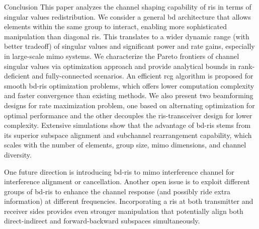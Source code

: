 \documentclass[journal]{IEEEtran}
\begin{document}
\begin{section}{Conclusion}
	This paper analyzes the channel shaping capability of \gls{ris} in terms of singular values redistribution.
	We consider a general \gls{bd} architecture that allows elements within the same group to interact, enabling more sophisticated manipulation than diagonal \gls{ris}.
	This translates to a wider dynamic range (with better tradeoff) of singular values and significant power and rate gains, especially in large-scale \gls{mimo} systems.
	We characterize the Pareto frontiers of channel singular values via optimization approach and provide analytical bounds in rank-deficient and fully-connected scenarios.
	An efficient \gls{rcg} algorithm is proposed for smooth \gls{bd}-\gls{ris} optimization problems, which offers lower computation complexity and faster convergence than existing methods.
	We also present two beamforming designs for rate maximization problem, one based on alternating optimization for optimal performance and the other decouples the \gls{ris}-transceiver design for lower complexity.
	Extensive simulations show that the advantage of \gls{bd}-\gls{ris} stems from its superior subspace alignment and subchannel rearrangement capability, which scales with the number of elements, group size, \gls{mimo} dimensions, and channel diversity.

	One future direction is introducing \gls{bd}-\gls{ris} to \gls{mimo} interference channel for interference alignment or cancellation.
	Another open issue is to exploit different groups of \gls{bd}-\gls{ris} to enhance the channel response (and possibly ride extra information) at different frequencies.
	Incorporating a \gls{ris} at both transmitter and receiver sides provides even stronger manipulation that potentially align both direct-indirect and forward-backward subspaces simultaneously.
\end{section}

\end{document}

